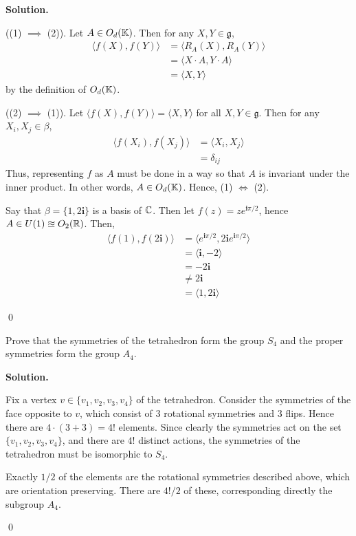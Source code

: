 \documentclass[12pt]{book}
\theoremstyle{definition}
\newenvironment{solution}
{%
  \par\noindent\textbf{Solution.}\quad
}
{%
  \qed\par
}
\begin{document}
\begin{solution}
  ((1) $\implies$ (2)). Let $A \in O_d(\mathbb{K})$.
  Then for any $X, Y \in \mathfrak{g}$, 
  \[
  \begin{aligned}
    \langle f(X), f(Y) \rangle &= \langle R_A(X), R_A(Y) \rangle \\
                               &= \langle X \cdot A, Y \cdot A \rangle \\
                               &= \langle X, Y \rangle
  \end{aligned}
  \]
  by the definition of $O_d(\mathbb{K})$.

  ((2) $\implies$ (1)). Let $\langle f(X), f(Y) \rangle = \langle X, Y \rangle$ for all $X, Y \in \mathfrak{g}$.
  Then for any $X_i, X_j \in \beta$,
  \[\begin{aligned}
    \langle f(X_i), f(X_j) \rangle &= \langle X_i, X_j \rangle \\
                                   &= \delta_{ij}
  \end{aligned}\]
  Thus, representing $f$ as $A$ must be done in a way so that $A$ is invariant under the inner product.
  In other words, $A \in O_d(\mathbb{K})$.
  Hence, (1) $\iff$ (2).

  Say that $\beta = \{1,2\mathbf{i}\}$ is a basis of $\mathbb{C}$.
  Then let $f(z) = ze^{\mathbf{i}\pi/2}$, hence $A \in U(1) \approxeq O_2(\mathbb{R})$.
  Then,
  \[
  \begin{aligned}
    \langle f(1), f(2\mathbf{i}) \rangle &=  \langle e^{\mathbf{i} \pi/2}, 2\mathbf{i}e^{\mathbf{i}\pi/2} \rangle \\
                                         &= \langle \mathbf{i}, -2 \rangle \\
                                         &= -2\mathbf{i} \\
                                         &\neq 2\mathbf{i} \\
                                         &= \langle 1, 2\mathbf{i} \rangle
  \end{aligned}
  \]



\end{solution}

\begin{taggedexercise}[\textcolor{green}{Complete}]
  Prove that the symmetries of the tetrahedron form the group $S_4$ and the proper symmetries form the group $A_4$.
\end{taggedexercise}

\begin{solution}
  Fix a vertex $v \in \{v_1, v_2, v_3, v_4\}$ of the tetrahedron.
  Consider the symmetries of the face opposite to $v$, which consist of $3$ rotational symmetries and $3$ flips. 
  Hence there are $4 \cdot (3 + 3) = 4!$ elements.
  Since clearly the symmetries act on the set $\{v_1, v_2, v_3, v_4\}$, and there are $4!$ distinct actions, the symmetries of the tetrahedron must be isomorphic to $S_4$.

  Exactly $1/2$ of the elements are the rotational symmetries described above, which are orientation preserving.
  There are $4!/2$ of these, corresponding directly the subgroup $A_4$.

\end{solution}
\end{document}
